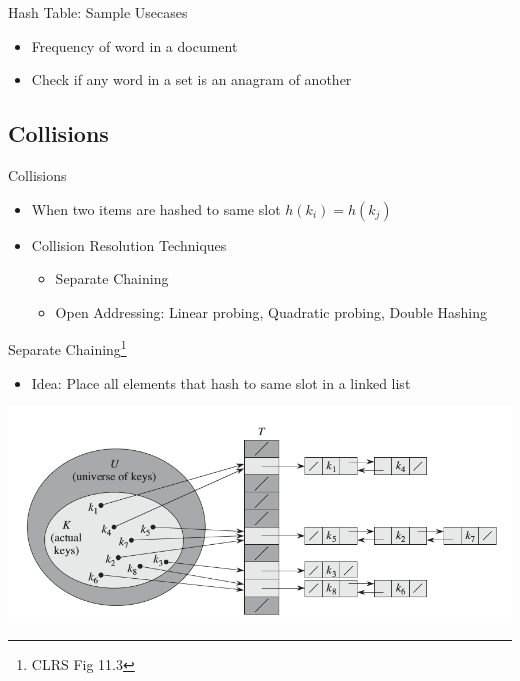 \documentclass{beamer}
\begin{document}
\begin{frame}{Hash Table: Sample Usecases}
    \begin{itemize}
        \item Frequency of word in a document
        \item Check if any word in a set is an anagram of another
    \end{itemize}
\end{frame}

\subsection{Collisions}
\begin{frame}{Collisions}
    \begin{itemize}
        \item When two items are hashed to same slot $h(k_i) = h(k_j)$
        \item Collision Resolution Techniques
        \begin{itemize}
            \item Separate Chaining
            \item Open Addressing: Linear probing, Quadratic probing, Double Hashing
        \end{itemize}
    \end{itemize}
\end{frame}


\begin{frame}{Separate Chaining\footnote{CLRS Fig 11.3}}
    \begin{itemize}
        \item Idea: Place all elements that hash to same slot in a linked list 
    \end{itemize}
    \begin{center}
        \includegraphics[scale=0.36]{hashTablesChaining.png}
    \end{center}
\end{frame}
\end{document}

